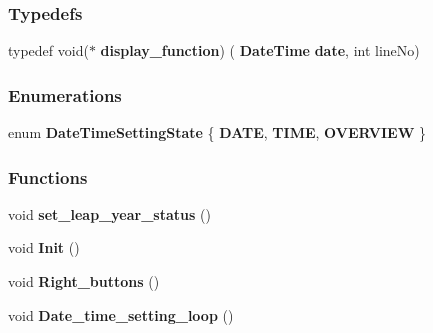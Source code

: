 \subsubsection*{Typedefs}
\begin{DoxyCompactItemize}
\item 
typedef void($\ast$ \textbf{ display\+\_\+function}) (\textbf{ Date\+Time} \textbf{ date}, int line\+No)
\end{DoxyCompactItemize}
\subsubsection*{Enumerations}
\begin{DoxyCompactItemize}
\item 
enum \textbf{ Date\+Time\+Setting\+State} \{ \textbf{ D\+A\+TE}, 
\textbf{ T\+I\+ME}, 
\textbf{ O\+V\+E\+R\+V\+I\+EW}
 \}
\end{DoxyCompactItemize}
\subsubsection*{Functions}
\begin{DoxyCompactItemize}
\item 
void \textbf{ set\+\_\+leap\+\_\+year\+\_\+status} ()
\item 
void \textbf{ Init} ()
\item 
void \textbf{ Right\+\_\+buttons} ()
\item 
void \textbf{ Date\+\_\+time\+\_\+setting\+\_\+loop} ()
\end{DoxyCompactItemize}
